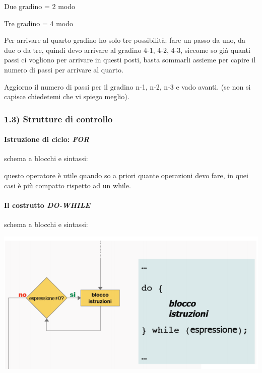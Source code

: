 \documentclass[
  paper=a4,
  oneside  ,captions=tableheading
]{scrbook}
\begin{document}
Due gradino = 2 modo

Tre gradino = 4 modo

Per arrivare al quarto gradino ho solo tre possibilità: fare un passo da
uno, da due o da tre, quindi devo arrivare al gradino 4-1, 4-2, 4-3,
siccome so già quanti passi ci vogliono per arrivare in questi posti,
basta sommarli assieme per capire il numero di passi per arrivare al
quarto.

Aggiorno il numero di passi per il gradino n-1, n-2, n-3 e vado avanti.
(se non si capisce chiedetemi che vi spiego meglio).

\hypertarget{strutture-di-controllo}{%
\subsubsection{1.3) Strutture di
controllo}\label{strutture-di-controllo}}

\hypertarget{istruzione-di-ciclo-for}{%
\paragraph{\texorpdfstring{Istruzione di ciclo:
\emph{FOR}}{Istruzione di ciclo: FOR}}\label{istruzione-di-ciclo-for}}

schema a blocchi e sintassi:

questo operatore è utile quando so a priori quante operazioni devo fare,
in quei casi è più compatto rispetto ad un while.

\hypertarget{il-costrutto-do-while}{%
\paragraph{\texorpdfstring{Il costrutto
\emph{DO-WHILE}}{Il costrutto DO-WHILE}}\label{il-costrutto-do-while}}

schema a blocchi e sintassi:

\includegraphics{./image/image-20201207224157049.png}
\end{document}
